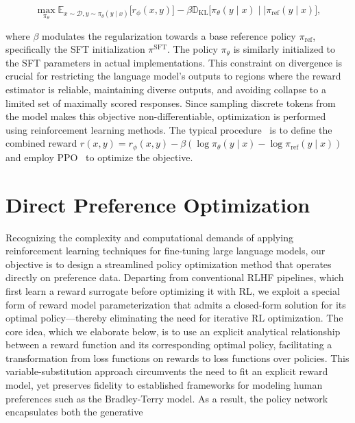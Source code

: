 \begin{equation}\label{eq:RL}
\max_{\pi_{\theta}}  \mathbb{E}_{x\sim \mathcal{D}, y\sim \pi_{\theta}(y \mid x)}\bigl[r_{\phi}(x, y)\bigr] - \beta\mathbb{D}_{\textrm{KL}}\bigl[\pi_{\theta}(y\mid x)\mid \mid \pi_\text{ref}(y\mid x)\bigr],
\end{equation}

where $\beta$ modulates the regularization towards a base reference policy $\pi_\text{ref}$, specifically the SFT initialization $\pi^\text{SFT}$. The policy $\pi_\theta$ is similarly initialized to the SFT parameters in actual implementations. This constraint on divergence is crucial for restricting the language model's outputs to regions where the reward estimator is reliable, maintaining diverse outputs, and avoiding collapse to a limited set of maximally scored responses. Since sampling discrete tokens from the model makes this objective non-differentiable, optimization is performed using reinforcement learning methods. The typical procedure~\cite{ziegler2020finetuning, stiennon2022learning, bai2022training, ouyang2022training} is to define the combined reward ${r(x, y) = r_{\phi}(x, y) -\beta (\log \pi_{\theta}(y\mid x) - \log \pi_\text{ref}(y\mid x))}$ and employ PPO~\cite{schulman2017proximal} to optimize the objective.

\section{Direct Preference Optimization}\label{sec:DPO}

Recognizing the complexity and computational demands of applying reinforcement learning techniques for fine-tuning large language models, our objective is to design a streamlined policy optimization method that operates directly on preference data. Departing from conventional RLHF pipelines, which first learn a reward surrogate before optimizing it with RL, we exploit a special form of reward model parameterization that admits a closed-form solution for its optimal policy—thereby eliminating the need for iterative RL optimization. The core idea, which we elaborate below, is to use an explicit analytical relationship between a reward function and its corresponding optimal policy, facilitating a transformation from loss functions on rewards to loss functions over policies. This variable-substitution approach circumvents the need to fit an explicit reward model, yet preserves fidelity to established frameworks for modeling human preferences such as the Bradley-Terry model. As a result, the policy network encapsulates both the generative

